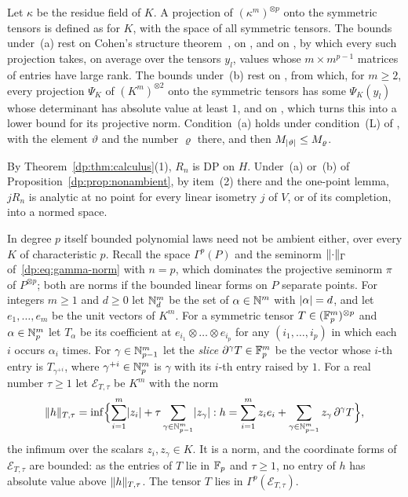 Let $\kappa$ be the residue field of $K$. A projection of $(\kappa^m)^{\otimes p}$ onto the symmetric tensors is defined as for $K$, with the space of all symmetric tensors. The bounds under~(a) rest on Cohen's structure theorem~\cite{Co}, on \cite[Lemma~K.2(2)]{I}, and on \cite[Lemma~Q.6(4)]{I}, by which every such projection takes, on average over the tensors $y_l$, values whose $m\times m^{p-1}$ matrices of entries have large rank. The bounds under~(b) rest on \cite[Proposition~N.12]{I}, from which, for $m\ge2$, every projection $\Psi_K$ of $(K^m)^{\otimes2}$ onto the symmetric tensors has some $\Psi_K(y_l)$ whose determinant has absolute value at least $1$, and on \cite[Lemma~N.15(2)]{I}, which turns this into a lower bound for its projective norm. Condition~(a) holds under condition~\textup{(L)} of \cite[Section~7.1]{I}, with the element $\vartheta$ and the number $\varrho$ there, and then $M_{\lvert \vartheta\rvert}\le M_\varrho$.

By Theorem~\ref{dp:thm:calculus}(1), $R_n$ is DP on $H$. Under~(a) or~(b) of Proposition~\ref{dp:prop:nonambient}, by item~(2) there and the one-point lemma, $jR_n$ is analytic at no point for every linear isometry $j$ of $V$, or of its completion, into a normed space.

In degree $p$ itself bounded polynomial laws need not be ambient either, over every $K$ of characteristic $p$. Recall the space $\Gamma^p(P)$ and the seminorm $\lVert \cdot\rVert_\Gamma$ of~\eqref{dp:eq:gamma-norm} with $n=p$, which dominates the projective seminorm $\pi$ of $P^{\otimes p}$; both are norms if the bounded linear forms on $P$ separate points. For integers $m\ge1$ and $d\ge0$ let $\mathbb N^m_d$ be the set of $\alpha\in\mathbb N^m$ with $\lvert \alpha\rvert=d$, and let $e_1,\dots,e_m$ be the unit vectors of $K^m$. For a symmetric tensor $T\in(\mathbb F_p^m)^{\otimes p}$ and $\alpha\in\mathbb N^m_p$ let $T_\alpha$ be its coefficient at $e_{i_1}\otimes\dots\otimes e_{i_p}$ for any $(i_1,\dots,i_p)$ in which each $i$ occurs $\alpha_i$ times. For $\gamma\in\mathbb N^m_{p-1}$ let the \emph{slice} $\partial^\gamma T\in\mathbb F_p^m$ be the vector whose $i$-th entry is $T_{\gamma^{+i}}$, where $\gamma^{+i}\in\mathbb N^m_p$ is $\gamma$ with its $i$-th entry raised by $1$. For a real number $\tau\ge1$ let $\mathcal E_{T,\tau}$ be $K^m$ with the norm
\begin{equation}\label{dp:eq:weighted-norm}
 \lVert h\rVert_{T,\tau}=\inf\Bigl\{\sum_{i=1}^m\lvert z_i\rvert+\tau\sum_{\gamma\in\mathbb N^m_{p-1}}\lvert z_\gamma\rvert:
 h=\sum_{i=1}^mz_ie_i+\sum_{\gamma\in\mathbb N^m_{p-1}}z_\gamma\,\partial^\gamma T\Bigr\},
\end{equation}
the infimum over the scalars $z_i,z_\gamma\in K$. It is a norm, and the coordinate forms of $\mathcal E_{T,\tau}$ are bounded: as the entries of $T$ lie in $\mathbb F_p$ and $\tau\ge1$, no entry of $h$ has absolute value above $\lVert h\rVert_{T,\tau}$. The tensor $T$ lies in $\Gamma^p(\mathcal E_{T,\tau})$.

